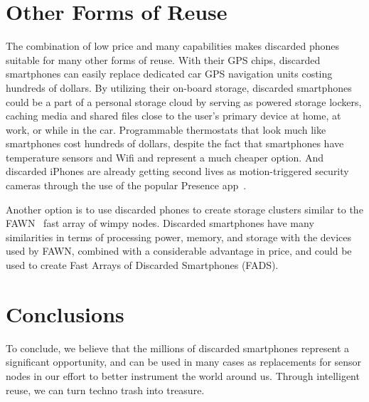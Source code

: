 \section{Other Forms of Reuse}
\label{sec-other}

The combination of low price and many capabilities makes discarded phones
suitable for many other forms of reuse. With their GPS chips, discarded
smartphones can easily replace dedicated car GPS navigation units costing
hundreds of dollars. By utilizing their on-board storage, discarded
smartphones could be a part of a personal storage cloud by serving as powered
storage lockers, caching media and shared files close to the user's primary
device at home, at work, or while in the car. Programmable thermostats that
look much like smartphones cost hundreds of dollars, despite the fact that
smartphones have temperature sensors and Wifi and represent a much cheaper
option. And discarded iPhones are already getting second lives as
motion-triggered security cameras through the use of the popular Presence
app~\cite{presence-peoplepower}.

Another option is to use discarded phones to create storage clusters similar
to the FAWN~\cite{fawn} fast array of wimpy nodes. Discarded smartphones have
many similarities in terms of processing power, memory, and storage with the
devices used by FAWN, combined with a considerable advantage in price, and
could be used to create Fast Arrays of Discarded Smartphones (FADS).

\section{Conclusions}
\label{sec-conclusion}

To conclude, we believe that the millions of discarded smartphones represent
a significant opportunity, and can be used in many cases as replacements for
sensor nodes in our effort to better instrument the world around us. Through
intelligent reuse, we can turn techno trash into treasure.
